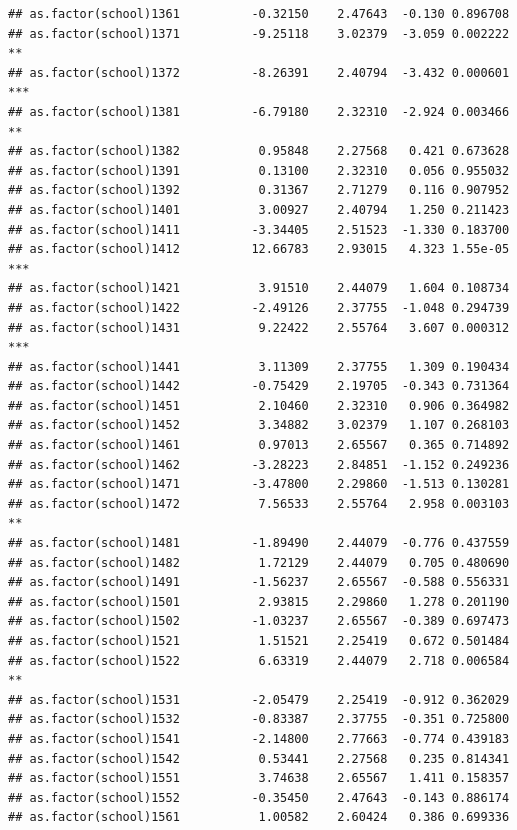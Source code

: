 \documentclass[ignorenonframetext,]{beamer}
\begin{document}
\begin{frame}[fragile]{}
\begin{verbatim}
## as.factor(school)1361          -0.32150    2.47643  -0.130 0.896708    
## as.factor(school)1371          -9.25118    3.02379  -3.059 0.002222 ** 
## as.factor(school)1372          -8.26391    2.40794  -3.432 0.000601 ***
## as.factor(school)1381          -6.79180    2.32310  -2.924 0.003466 ** 
## as.factor(school)1382           0.95848    2.27568   0.421 0.673628    
## as.factor(school)1391           0.13100    2.32310   0.056 0.955032    
## as.factor(school)1392           0.31367    2.71279   0.116 0.907952    
## as.factor(school)1401           3.00927    2.40794   1.250 0.211423    
## as.factor(school)1411          -3.34405    2.51523  -1.330 0.183700    
## as.factor(school)1412          12.66783    2.93015   4.323 1.55e-05 ***
## as.factor(school)1421           3.91510    2.44079   1.604 0.108734    
## as.factor(school)1422          -2.49126    2.37755  -1.048 0.294739    
## as.factor(school)1431           9.22422    2.55764   3.607 0.000312 ***
## as.factor(school)1441           3.11309    2.37755   1.309 0.190434    
## as.factor(school)1442          -0.75429    2.19705  -0.343 0.731364    
## as.factor(school)1451           2.10460    2.32310   0.906 0.364982    
## as.factor(school)1452           3.34882    3.02379   1.107 0.268103    
## as.factor(school)1461           0.97013    2.65567   0.365 0.714892    
## as.factor(school)1462          -3.28223    2.84851  -1.152 0.249236    
## as.factor(school)1471          -3.47800    2.29860  -1.513 0.130281    
## as.factor(school)1472           7.56533    2.55764   2.958 0.003103 ** 
## as.factor(school)1481          -1.89490    2.44079  -0.776 0.437559    
## as.factor(school)1482           1.72129    2.44079   0.705 0.480690    
## as.factor(school)1491          -1.56237    2.65567  -0.588 0.556331    
## as.factor(school)1501           2.93815    2.29860   1.278 0.201190    
## as.factor(school)1502          -1.03237    2.65567  -0.389 0.697473    
## as.factor(school)1521           1.51521    2.25419   0.672 0.501484    
## as.factor(school)1522           6.63319    2.44079   2.718 0.006584 ** 
## as.factor(school)1531          -2.05479    2.25419  -0.912 0.362029    
## as.factor(school)1532          -0.83387    2.37755  -0.351 0.725800    
## as.factor(school)1541          -2.14800    2.77663  -0.774 0.439183    
## as.factor(school)1542           0.53441    2.27568   0.235 0.814341    
## as.factor(school)1551           3.74638    2.65567   1.411 0.158357    
## as.factor(school)1552          -0.35450    2.47643  -0.143 0.886174    
## as.factor(school)1561           1.00582    2.60424   0.386 0.699336    

\end{verbatim}
\end{frame}
\end{document}
